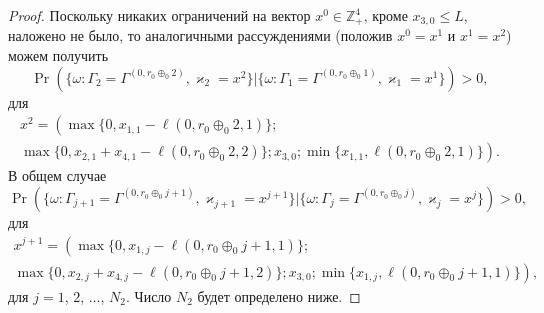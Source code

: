 \begin{proof}
Поскольку никаких ограничений на вектор $x^0 \in \mathbb{Z}_+^4$,  кроме $x_{3,  0}\leqslant L$,  наложено не было,  то аналогичными рассуждениями (положив $x^0=x^1$ и $x^1=x^2$) можем получить
\begin{equation*}
\Pr (\{\omega\colon\Gamma_{2}=\Gamma^{(0,  r_0\oplus_{0}2)}, \varkappa_{2}=x^2 \} |\{\omega\colon \Gamma_{1}=\Gamma^{(0,  r_0\oplus_{0}1)}, \varkappa_1=x^1\}) > 0, 
\end{equation*}
для 
\begin{multline*}
x^2  =\left(\max{\{0,  x_{1,  1} - \ell(0,  r_0\oplus_{0}2,  1)\}}; \right. \\
\left. \max{\{0,  x_{2,  1} + x_{4,  1}  - \ell(0,  r_0\oplus_{0}2,  2)\}}; x_{3,  0};\min{\{x_{1,  1}, \ell(0,  r_0\oplus_{0}2,  1)\}}\right).
\end{multline*}
В общем случае
\begin{equation*}
\Pr (\{\omega\colon\Gamma_{j+1}=\Gamma^{(0,  r_0\oplus_{0}j+1)}, \varkappa_{j+1}=x^{j+1} \} |\{\omega\colon \Gamma_{j}=\Gamma^{(0,  r_0\oplus_{0}j)},  \varkappa_j=x^j\}) > 0, 
\end{equation*}
для 
\begin{multline*}
x^{j+1}  =\left(\max{\{0,  x_{1,  j} - \ell(0,  r_0\oplus_{0}j+1,  1)\}}; \right. \\
\left. \max{\{0,  x_{2, j} + x_{4, j}  - \ell(0,  r_0\oplus_{0}j+1,  2)\}}; x_{3,  0};\min{\{x_{1,  j},  \ell(0,  r_0\oplus_{0}j+1,  1)\}}\right), 
\end{multline*}
для $j = 1$,  $2$,  $\ldots$,  $N_2$. Число $N_2$ будет определено ниже.


\end{proof}
